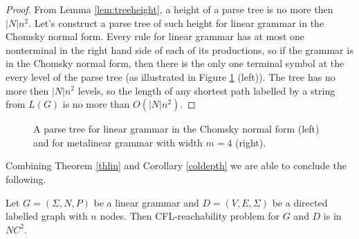 \begin{proof}
From Lemma \ref{lem:treeheight}, a height of a parse tree is no more then $|N|n^2$. Let's construct a parse tree of such height for linear grammar in the Chomsky normal form. Every rule for linear grammar has at most one nonterminal in the right hand side of each of its productions, so if the grammar is in the Chomsky normal form, then there is the only one terminal symbol at the every level of the parse tree (as illustrated in Figure \ref{ptlin} (left)). The tree has no more then $|N|n^2$ levels, so the length of any shortest path labelled by a string from $L(G)$ is no more than $O(|N|n^2)$.
\end{proof}
\begin{figure}
\caption{A parse tree for linear grammar in the Chomsky normal form (left) and for metalinear grammar with width $m=4$ (right).}
\label{ptlin}       %
\end{figure}


Combining Theorem \ref{thlin} and Corollary \ref{coldepth} we are able to conclude the following.
\begin{corollary} 
\label{linear}
Let  $G = (\Sigma, N, P)$ be a linear grammar and $D=(V, E, \Sigma)$ be a directed labelled graph with $n$ nodes. Then CFL-reachability problem for $G$ and $D$ is in $NC^2$.
\end{corollary}


